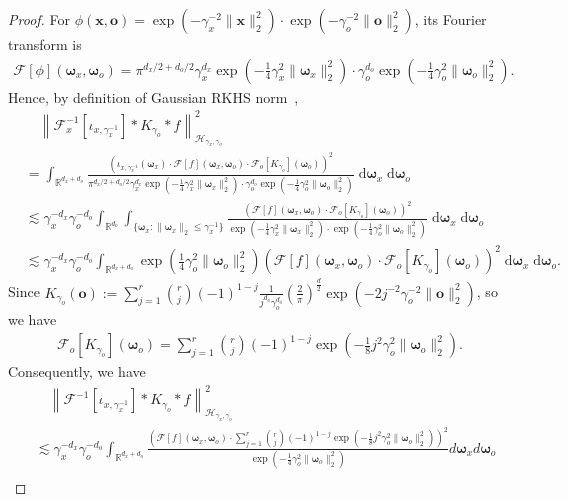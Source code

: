 \documentclass[11pt]{article}
\newcommand{\bx}{\mathbf x}
\newcommand{\bo}{\mathbf o}
\newcommand{\bomega}{\boldsymbol{\omega}}
\newcommand{\calF}{\mathcal{F}}
\newcommand{\calH}{\mathcal{H}}
\newcommand{\R}{\mathbb{R}}
\newcommand{\0}{\mathbf{0}}
\begin{document}
\begin{appendix}
\begin{proof}
For $\phi(\bx,\bo) = \exp(- \gamma_x^{-2} \|\bx\|_2^2) \cdot \exp(- \gamma_o^{-2} \|\bo\|_2^2)$, its Fourier transform is 
\begin{align*}
    \calF[\phi](\bomega_x,\bomega_o) = \pi^{d_x/2+d_o/2} \gamma_x^{d_x} \exp\left(-\frac{1}{4} \gamma_x^{2} \|\bomega_x\|_2^2\right) \cdot \gamma_o^{d_o}\exp\left(-\frac{1}{4} \gamma_o^{2} \|\bomega_o\|_2^2\right).
\end{align*}
Hence, by definition of Gaussian RKHS norm~\citep[Theorem 10.12]{wendland2004scattered}, 
\begin{align*}
    &\quad \left\| \calF_x^{-1}[\iota_{x,\gamma_x^{-1}}]\ast K_{\gamma_o} \ast f\right\|_{\calH_{\gamma_x,\gamma_o}}^2 \\
    &= \int_{\R^{d_x+d_o}} \frac{\left(\iota_{x,\gamma_x^{-1}}(\bomega_x) \cdot \calF[f](\bomega_x,\bomega_o) \cdot \calF_o[K_{\gamma_o}](\bomega_o)\right)^2}{\pi^{d_x/2+d_o/2} \gamma_x^{d_x} \exp\left(-\frac{1}{4} \gamma_x^{2} \|\bomega_x\|_2^2\right) \cdot \gamma_o^{d_o}\exp(-\frac{1}{4} \gamma_o^{2} \|\bomega_o\|_2^2)} \;\mathrm{d}\bomega_x \;\mathrm{d}\bomega_o \\
    &\lesssim \gamma_x^{-d_x} \gamma_o^{-d_o} \int_{\R^{d_o}}\int_{\{\bomega_x: \|\bomega_x\|_2 \leq \gamma_x^{-1} \}} \frac{\left( \calF[f](\bomega_x,\bomega_o) \cdot \calF_o[K_{\gamma_o}](\bomega_o)\right)^2}{\exp\left(-\frac{1}{4} \gamma_x^{2} \|\bomega_x\|_2^2\right) \cdot \exp(-\frac{1}{4} \gamma_o^{2} \|\bomega_o\|_2^2)} \;\mathrm{d}\bomega_x \;\mathrm{d}\bomega_o \\
    &\lesssim \gamma_x^{-d_x} \gamma_o^{-d_o} \int_{\R^{d_x+d_o}} \exp\left(\frac{1}{4} \gamma_o^{2} \|\bomega_o\|_2^2\right)\left(\calF[f](\bomega_x,\bomega_o) \cdot \calF_o[K_{\gamma_o}](\bomega_o)\right)^2 \;\mathrm{d}\bomega_x \;\mathrm{d}\bomega_o .
\end{align*}
Since $K_{\gamma_o}(\bo) :=  \sum_{j=1}^r\binom{r}{j}(-1)^{1-j} \frac{1}{j^{d_o}\gamma_o^{d_o}}\left(\frac{2}{\pi}\right)^{\frac{d}{2}}  \exp( -2 j^{-2} \gamma_o^{-2} \|\bo\|_2^2)$, so we have 
\begin{align*}
    \calF_o[K_{\gamma_o}](\bomega_o) = \sum_{j=1}^r\binom{r}{j}(-1)^{1-j} \exp\left(-\frac{1}{8} j^2 \gamma_o^2 \|\bomega_o\|_2^2\right) .
\end{align*}
Consequently, we have
\begin{align*}
    &\quad \left\| \calF^{-1}[\iota_{x,\gamma_x^{-1}}]\ast K_{\gamma_o} \ast f\right\|_{\calH_{\gamma_x,\gamma_o}}^2 \\
    &\lesssim \gamma_x^{-d_x} \gamma_o^{-d_o} \int_{\R^{d_x+d_o}} \frac{\left(\calF[f](\bomega_x,\bomega_o) \cdot \sum_{j=1}^r\binom{r}{j}(-1)^{1-j} \exp(-\frac{1}{8} j^2 \gamma_o^2 \|\bomega_o\|_2^2) \right)^2}{\exp(-\frac{1}{4} \gamma_o^{2} \|\bomega_o\|_2^2)} d\bomega_x d\bomega_o \\

\end{align*}
\end{proof}
\end{appendix}
\end{document}
